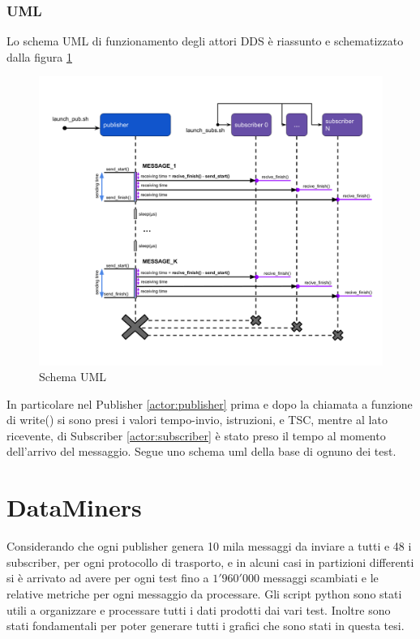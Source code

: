 \subsubsection{UML}
Lo schema UML di funzionamento degli attori DDS è riassunto e schematizzato dalla figura \ref{fig:uml}
\begin{figure}[H]
    \centering
    \includegraphics[width=\textwidth]{./img/umel-send-receive.png}
    \caption{Schema UML} %
    \label{fig:uml}
\end{figure}

In particolare nel Publisher \ref{actor:publisher} prima e dopo la chiamata a funzione di write() %
si sono presi i valori tempo-invio, istruzioni, e TSC, mentre al lato ricevente, di Subscriber \ref{actor:subscriber} è stato preso il tempo al momento dell'arrivo del messaggio. Segue uno schema uml della base di ognuno dei test.


\section{DataMiners}
Considerando che ogni publisher genera 10 mila messaggi da inviare a tutti e 48 i subscriber, per ogni protocollo di trasporto, e in alcuni casi in partizioni differenti si è arrivato ad avere per ogni test fino a $1'960'000$ messaggi scambiati e le relative metriche per ogni messaggio da processare. 
Gli script python sono stati utili a organizzare e processare tutti i dati prodotti dai vari test. Inoltre sono stati fondamentali per poter generare tutti i grafici che sono stati in questa tesi.


